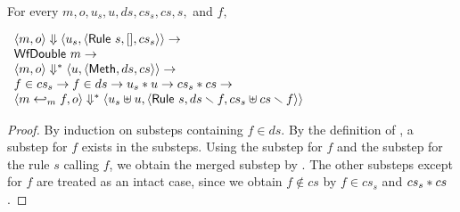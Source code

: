 \begin{lemma}
  \label{lem-inlinedmm-rule}
  \mbox{}\\
  For every $m, o, u_s, u, ds, cs_s, cs, s,$ and $f,$
  \begin{center}
    \begin{math}
      \begin{array}{l}
        \langle m, o \rangle \Downarrow \langle u_s, \langle \textsf{Rule}\ s, [], cs_s \rangle \rangle \to \\
        \textsf{WfDouble}\ m \to \\
        \langle m, o \rangle \Downarrow^{\ast} \langle u, \langle \textsf{Meth}, ds, cs \rangle \rangle \to \\
        f \in cs_s \to f \in ds \to u_s \ast u \to cs_s \ast cs \to \\
        \langle m \hookleftarrow_{m}{} f, o \rangle \Downarrow^{\ast} \langle u_s \uplus u, \langle \textsf{Rule}\ s, ds \smallsetminus{} f, cs_s \uplus cs \smallsetminus{} f \rangle \rangle
      \end{array}
    \end{math}
  \end{center}
\end{lemma}
\begin{proof}
  By induction on substeps containing $f \in ds$. By the definition of
  \Substeps{}, a substep for $f$ exists in the substeps. Using the
  substep for $f$ and the substep for the rule $s$ calling $f$, we
  obtain the merged substep by
  . The other substeps except for
  $f$ are treated as an intact case, since we obtain $f \notin cs$ by
  $f \in cs_s$ and $cs_s \ast cs$.
\end{proof}

